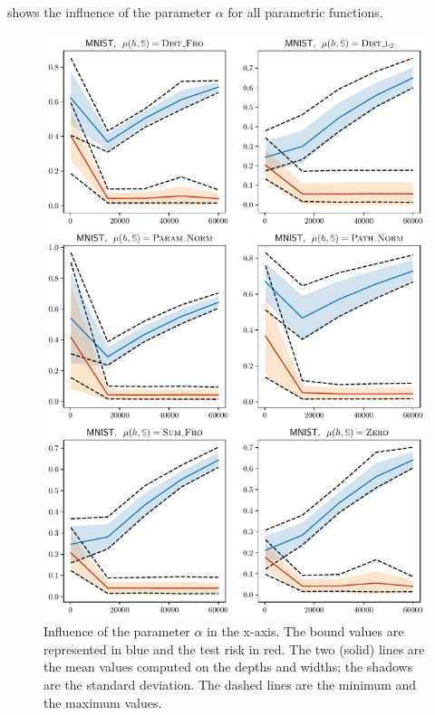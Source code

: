 \begin{noaddcontents}
 shows the influence of the parameter $\alpha$ for all parametric functions.

\begin{figure}
    \centering
    \includegraphics[width=0.77\linewidth]{chapter_7/figures/influence_alpha_mnist.pdf}
    \caption{
    Influence of the parameter $\alpha$ in the x-axis.
    The bound values are represented in blue and the test risk in red. 
    The two (solid) lines are the mean values computed on the depths and widths; the shadows are the standard deviation.
    The dashed lines are the minimum and the maximum values.
    }
    \label{ap:dis-mu:fig:influence-alpha-1}
\end{figure}


\end{noaddcontents}
